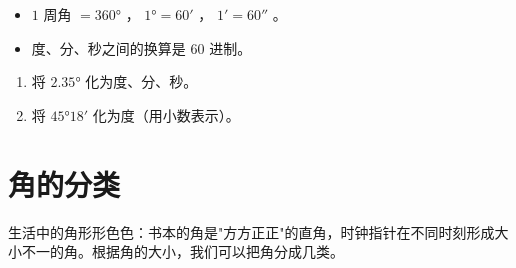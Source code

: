 \begin{keytakeaway}


\begin{itemize}
  \item $1$ 周角 $= 360°$ ， $1° = 60'$ ， $1' = 60''$ 。
  \item 度、分、秒之间的换算是 $60$ 进制。
\end{itemize}


\end{keytakeaway}

\begin{practice}


\begin{enumerate}
  \item 将 $2.35°$ 化为度、分、秒。
  \item 将 $45°18'$ 化为度（用小数表示）。
\end{enumerate}


\end{practice}



\section*{角的分类}


\begin{explore}


生活中的角形形色色：书本的角是"方方正正"的直角，时钟指针在不同时刻形成大小不一的角。根据角的大小，我们可以把角分成几类。

\end{explore}

